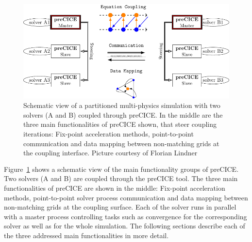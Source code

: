   \begin{figure}[htbp]
  	\centering
  	\includegraphics[width=0.97\linewidth]{figures/NewCommunicationScheme}
  	\caption{Schematic view of a partitioned multi-physics simulation with two solvers (A and B) coupled through preCICE. In the middle are the three main functionalities of preCICE shown, that steer coupling iterations: Fix-point acceleration methods, point-to-point communication and data mapping between non-matching grids at the coupling interface. Picture courtesy of Florian Lindner~\cite{bungartz2015fully} }
  	\label{fig:precice}
  \end{figure}
  
  Figure~\ref{fig:precice} shows a schematic view of the main functionality groups of preCICE. Two solvers (A and B) are coupled through the preCICE tool. The three main functionalities of preCICE are shown in the middle: Fix-point acceleration methods, point-to-point solver process communication and data mapping between non-matching grids at the coupling surface. Each of the solver runs in parallel with a master process controlling tasks such as convergence for the corresponding solver as well as for the whole simulation. The following sections describe each of the three addressed main functionalities in more detail.
  
 
